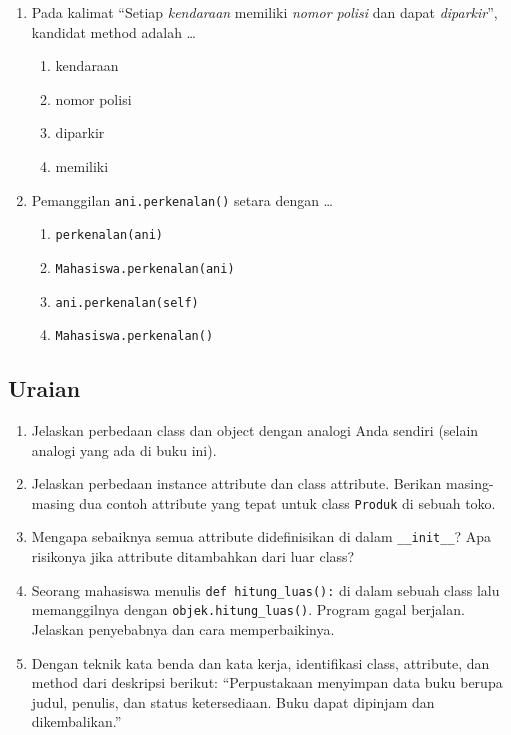 \begin{enumerate}
  \item Pada kalimat ``Setiap \emph{kendaraan} memiliki \emph{nomor polisi} dan dapat \emph{diparkir}'', kandidat method adalah \ldots
  \begin{enumerate}[label=\alph*.,itemsep=0pt]
    \item kendaraan
    \item nomor polisi
    \item diparkir
    \item memiliki
  \end{enumerate}

  \item Pemanggilan \texttt{ani.perkenalan()} setara dengan \ldots
  \begin{enumerate}[label=\alph*.,itemsep=0pt]
    \item \texttt{perkenalan(ani)}
    \item \texttt{Mahasiswa.perkenalan(ani)}
    \item \texttt{ani.perkenalan(self)}
    \item \texttt{Mahasiswa.perkenalan()}
  \end{enumerate}
\end{enumerate}

\subsection{Uraian}

\begin{enumerate}
  \item Jelaskan perbedaan class dan object dengan analogi Anda sendiri (selain analogi yang ada di buku ini).
  \item Jelaskan perbedaan instance attribute dan class attribute. Berikan masing-masing dua contoh attribute yang tepat untuk class \texttt{Produk} di sebuah toko.
  \item Mengapa sebaiknya semua attribute didefinisikan di dalam \texttt{\_\_init\_\_}? Apa risikonya jika attribute ditambahkan dari luar class?
  \item Seorang mahasiswa menulis \texttt{def hitung\_luas():} di dalam sebuah class lalu memanggilnya dengan \texttt{objek.hitung\_luas()}. Program gagal berjalan. Jelaskan penyebabnya dan cara memperbaikinya.
  \item Dengan teknik kata benda dan kata kerja, identifikasi class, attribute, dan method dari deskripsi berikut: ``Perpustakaan menyimpan data buku berupa judul, penulis, dan status ketersediaan. Buku dapat dipinjam dan dikembalikan.''
\end{enumerate}


